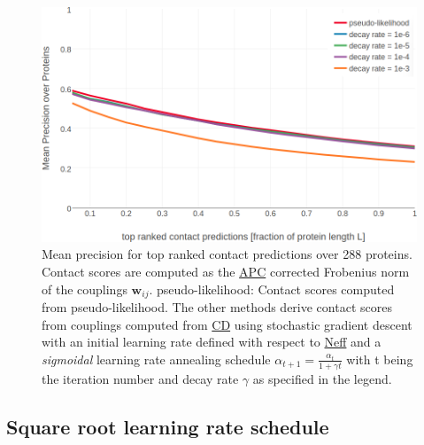 \documentclass[11pt,a4paper,twoside]{book}
\newcommand{\wij}{\mathbf{w}_{ij}}
\theoremstyle{definition}
\theoremstyle{definition}
\theoremstyle{remark}
\begin{document}
\begin{figure}

{\centering \includegraphics[width=1\linewidth]{img/full_likelihood/appendix/precision_vs_rank_alpha0_0_sig_decayrate} 

}

\caption{Mean precision for top ranked
contact predictions over 288 proteins. Contact scores are computed as
the \protect\hyperlink{abbrev}{APC} corrected Frobenius norm of the
couplings \(\wij\). pseudo-likelihood: Contact scores computed from
pseudo-likelihood. The other methods derive contact scores from
couplings computed from \protect\hyperlink{abbrev}{CD} using stochastic
gradient descent with an initial learning rate defined with respect to
\protect\hyperlink{abbrev}{Neff} and a \emph{sigmoidal} learning rate
annealing schedule \(\alpha_{t+1} = \frac{\alpha_{t}}{1 + \gamma t}\)
with t being the iteration number and decay rate \(\gamma\) as specified
in the legend.}\label{fig:performance-cd-sigschedule}
\end{figure}

\subsection{Square root learning rate
schedule}\label{square-root-learning-rate-schedule}
\end{document}
